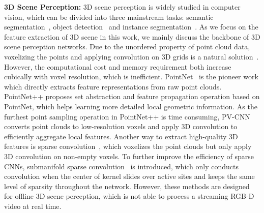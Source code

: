 \textbf{3D Scene Perception:}
3D scene perception is widely studied in computer vision, which can be divided into three mainstream tasks: semantic segmentation~\cite{qi2017pointnet,qi2017pointnet++,graham20183d,choy20194d}, object detection~\cite{hou20193d,Qi_2019_ICCV,rukhovich2022fcaf3d,wang2022cagroup3d} and instance segmentation~\cite{yi2019gspn,jiang2020pointgroup,vu2022softgroup,schult2022mask3d,kolodiazhnyi2023top}.
As we focus on the feature extraction of 3D scene in this work, we mainly discuss the backbone of 3D scene perception networks. Due to the unordered property of point cloud data, voxelizing the points and applying convolution on 3D grids is a natural solution~\cite{chang2015shapenet,qi2016volumetric}.
However, the computational cost and memory requirement both increase cubically with voxel resolution, which is inefficient.
PointNet~\cite{qi2017pointnet} is the pioneer work which directly extracts feature representations from raw point clouds. PointNet++ proposes set abstraction and feature propagation operation based on PointNet, which helps learning more detailed local geometric information. As the furthest point sampling operation in PointNet++ is time consuming, PV-CNN~\cite{liu2019point} converts point clouds to low-resolution voxels and apply 3D convolution to efficiently aggregate local features. Another way to extract high-quality 3D features is sparse convolution~\cite{graham2014spatially,engelcke2017vote3deep}, which voxelizes the point clouds but only apply 3D convolution on non-empty voxels. To further improve the efficiency of sparse CNNs, submanifold sparse convolution~\cite{graham20183d,choy20194d} is introduced, which only conducts convolution when the center of kernel slides over active sites and keeps the same level of sparsity throughout the network. However, these methods are designed for offline 3D scene perception, which is not able to process a streaming RGB-D video at real time.


